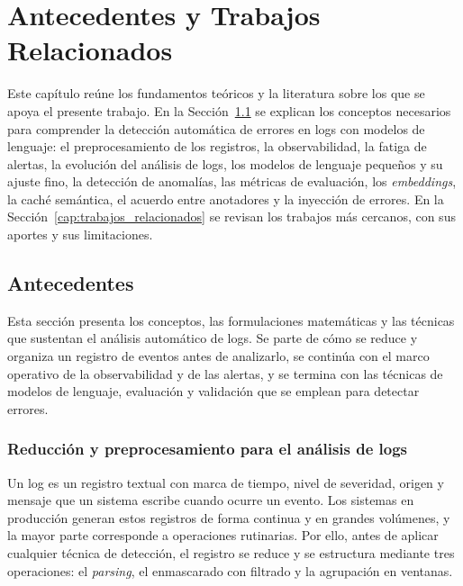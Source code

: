 \chapter{Antecedentes y Trabajos Relacionados} \label{cap:antecedentes}

Este capítulo reúne los fundamentos teóricos y la literatura sobre los que se apoya el presente trabajo. En la Sección~\ref{sec:antecedentes} se explican los conceptos necesarios para comprender la detección automática de errores en logs con modelos de lenguaje: el preprocesamiento de los registros, la observabilidad, la fatiga de alertas, la evolución del análisis de logs, los modelos de lenguaje pequeños y su ajuste fino, la detección de anomalías, las métricas de evaluación, los \textit{embeddings}, la caché semántica, el acuerdo entre anotadores y la inyección de errores. En la Sección~\ref{cap:trabajos_relacionados} se revisan los trabajos más cercanos, con sus aportes y sus limitaciones.

\section{Antecedentes}\label{sec:antecedentes}

Esta sección presenta los conceptos, las formulaciones matemáticas y las técnicas que sustentan el análisis automático de logs. Se parte de cómo se reduce y organiza un registro de eventos antes de analizarlo, se continúa con el marco operativo de la observabilidad y de las alertas, y se termina con las técnicas de modelos de lenguaje, evaluación y validación que se emplean para detectar errores.

\subsection{Reducción y preprocesamiento para el análisis de logs}\label{sec:ant_preprocesamiento}

Un log es un registro textual con marca de tiempo, nivel de severidad, origen y mensaje que un sistema escribe cuando ocurre un evento. Los sistemas en producción generan estos registros de forma continua y en grandes volúmenes, y la mayor parte corresponde a operaciones rutinarias. Por ello, antes de aplicar cualquier técnica de detección, el registro se reduce y se estructura mediante tres operaciones: el \textit{parsing}, el enmascarado con filtrado y la agrupación en ventanas.


